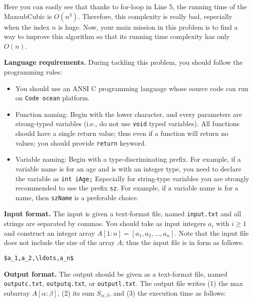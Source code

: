 \documentclass{article}
\begin{document}
Here you can easily see that thanks to for-loop in Line 5, 
the running time of the \textsf{MaxsubCubic} is $O(n^3)$. 
Therefore, this complexity is really bad, especially when the index $n$ is huge.
Now, your main mission in this problem is to find a way to improve this algorithm so that 
its running time complexity has only $O(n)$.






\bigskip
\noindent\textbf{Language requirements. }%
During tackling this problem, you should follow the programming rules:
\begin{itemize}
\item You should use an ANSI C programming language whose source code can run on \texttt{Code ocean} platform. 
\item Function naming: Begin with the lower character, and every parameters are strong-typed variables (i.e., do not use \texttt{void} typed variables).
	All functions should have a single return value; thus even if a function will return no values; you should provide \texttt{return} keyword.
\item Variable naming: Begin with a type-discriminating prefix. For example, if a variable name is for an age and is with an integer type,
	you need to declare the variable as \texttt{int iAge;}  Especially for string-type variables you are strongly recommended to use the prefix \texttt{sz}.
	For example, if a variable name is for a name, then \texttt{szName} is a preferable choice.
\end{itemize}

\bigskip
\noindent\textbf{Input format.} %
The input is given a text-format file, named \texttt{input.txt} and all strings are separated by commas.
You should take as input integers $a_i$ with $i\geq 1$ and construct an integer array $A[1:n]=[a_1,a_2,\ldots,a_n]$.
Note that the input file does not include the size of the array $A$; thus the input file is in form as follows:
\begin{lstlisting}[backgroundcolor=\color{yellow!40}]
$a_1,a_2,\ldots,a_n$
\end{lstlisting}



\bigskip
\noindent\textbf{Output format.} %
The output should be given as a text-format file, named \texttt{outputc.txt}, \texttt{outputq.txt}, or \texttt{outputl.txt}.
The output file writes (1) the max subarray $A[\alpha:\beta]$, (2) its sum $S_{\alpha:\beta}$, and (3) the execution time as follows:
\end{document}
